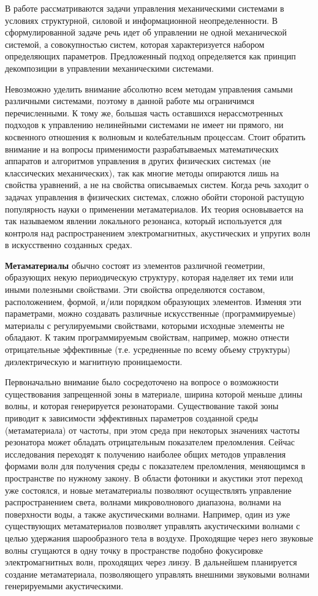 В работе \cite{intro_pyatn} рассматриваются задачи управления механическими системами в условиях структурной, силовой и информационной неопределенности. В сформулированной задаче речь идет об управлении не одной механической системой, а совокупностью систем, которая характеризуется набором определяющих параметров. Предложенный подход определяется как принцип декомпозиции в управлении механическими системами.

Невозможно уделить внимание абсолютно всем методам управления самыми различными системами, поэтому в данной работе мы ограничимся перечисленными. К тому же, большая часть оставшихся нерассмотренных подходов к управлению нелинейными системами не имеет ни прямого, ни косвенного отношения к волновым и колебательным процессам.
Стоит обратить внимание и на вопросы применимости разрабатываемых математических аппаратов и алгоритмов управления в других физических системах (не классических механических), так как многие методы опираются лишь на свойства уравнений, а не на свойства описываемых систем. Когда речь заходит о задачах управления в физических системах, сложно обойти стороной растущую популярность науки о применении метаматериалов. Их теория основывается на так называемом явлении локального резонанса, который используется для контроля над распространением электромагнитных, акустических и упругих волн в искусственно созданных средах. 

\textbf{Метаматериалы} обычно состоят из элементов различной геометрии, образующих некую периодическую структуру, которая наделяет их теми или иными полезными свойствами. Эти свойства определяются составом, расположением, формой, и/или порядком образующих элементов. Изменяя эти параметрами, можно создавать различные искусственные (программируемые) материалы с регулируемыми свойствами, которыми исходные элементы не обладают. К таким программируемым свойствам, например, можно отнести отрицательные эффективные (т.е. усредненные по всему объему структуры) диэлектрическую и магнитную проницаемости.

Первоначально внимание было сосредоточено на вопросе о возможности существования запрещенной зоны в материале, ширина которой меньше длины волны, и которая генерируется резонаторами. Существование такой зоны приводит к зависимости эффективных параметров созданной среды (метаматериала) от частоты, при этом среда при некоторых значениях частоты резонатора может обладать отрицательным показателем преломления. Сейчас исследования переходят к получению наиболее общих методов управления формами волн для получения среды с показателем преломления, меняющимся в пространстве по нужному закону. В области фотоники и акустики этот переход уже состоялся, и новые метаматериалы позволяют осуществлять управление распространением света, волнами микроволнового диапазона, волнами на поверхности воды, а также акустическими волнами. 
Например, один из уже существующих метаматериалов позволяет управлять акустическими волнами с целью удержания шарообразного тела в воздухе. Проходящие через него звуковые волны сгущаются в одну точку в пространстве подобно фокусировке электромагнитных волн, проходящих через линзу. В дальнейшем планируется создание метаматериала, позволяющего управлять внешними звуковыми волнами генерируемыми акустическими.

